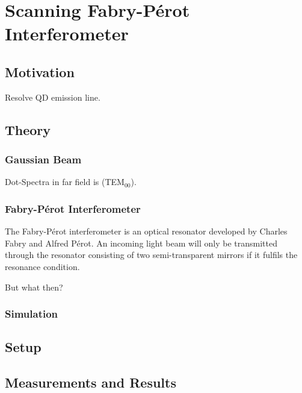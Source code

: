 \chapter{Scanning Fabry-Pérot Interferometer}

\section{Motivation}

Resolve QD emission line.

\section{Theory}

\subsection{Gaussian Beam}

Dot-Spectra in far field is (TEM$_{00}$).

\subsection{Fabry-Pérot Interferometer}

The Fabry-Pérot interferometer is an optical resonator developed by Charles Fabry and Alfred Pérot.
An incoming light beam will only be transmitted through the resonator consisting of two semi-transparent mirrors if it fulfils the resonance condition.\cite{kaldewey_coherent_2017}

But what then?

\subsection{Simulation}




\section{Setup}

\section{Measurements and Results}